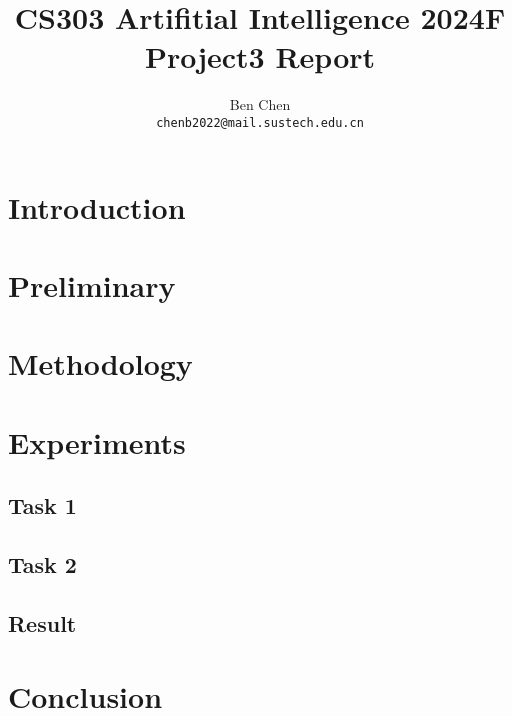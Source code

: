 \documentclass{article}
\title{\textbf{CS303 Artifitial Intelligence 2024F Project3 Report}}
\author{Ben Chen \\ \texttt{chenb2022@mail.sustech.edu.cn}}
\begin{document}
\maketitle

\section{Introduction}

\section{Preliminary}

\section{Methodology}

\section{Experiments}

\subsection{Task 1}

\subsection{Task 2}

\subsection{Result}

\section{Conclusion}
\end{document}
